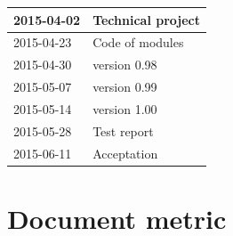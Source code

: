 \documentclass{article}
\begin{document}
\begin{center}

	\begin{tabular}{| l | p{7cm} |}

		\hline
	  	2015-04-02 & Technical project \\
		
		\hline
	  	2015-04-23 & Code of modules\\
	
		\hline
		2015-04-30 & version 0.98\\

		\hline
		2015-05-07 & version 0.99\\	
		
		\hline
		2015-05-14 & version 1.00\\
		
		\hline
		2015-05-28 & Test report\\
		
		\hline
		2015-06-11 & Acceptation \\
		
		\hline
	
	\end{tabular}

\end{center}

\section{Document metric}
\end{document}
